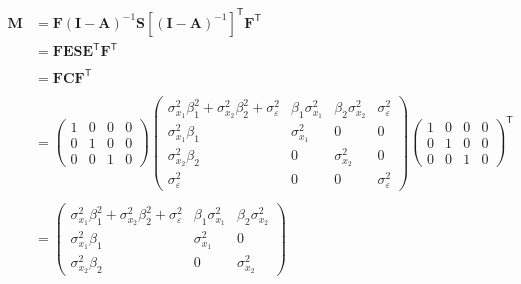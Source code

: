 \documentclass[
]{book}
\theoremstyle{definition}
\theoremstyle{definition}
\theoremstyle{definition}
\theoremstyle{remark}
\begin{document}
\begin{align*}\mathbf{M} &=\mathbf{F} \left( \mathbf{I} - \mathbf{A} \right)^{-1} \mathbf{S} \left[ \left( \mathbf{I} - \mathbf{A} \right)^{-1} \right]^{\mathsf{T}} \mathbf{F}^{\mathsf{T}}\\ &=\mathbf{F} \mathbf{E} \mathbf{S} \mathbf{E}^{\mathsf{T}} \mathbf{F}^{\mathsf{T}} \\\\ &=\mathbf{F} \mathbf{C} \mathbf{F}^{\mathsf{T}} \\\\ &=\left( \begin{array}{cccc} 1 & 0 & 0 & 0 \\ 0 & 1 & 0 & 0 \\ 0 & 0 & 1 & 0 \end{array} \right)\left( \begin{array}{cccc} \sigma  _{x _{1}} ^{2} \beta  _{1} ^{2} + \sigma  _{x _{2}} ^{2} \beta  _{2} ^{2} + \sigma  _{\varepsilon } ^{2} & \beta  _{1} \sigma  _{x _{1}} ^{2} & \beta  _{2} \sigma  _{x _{2}} ^{2} & \sigma  _{\varepsilon } ^{2} \\ \sigma  _{x _{1}} ^{2} \beta  _{1} & \sigma  _{x _{1}} ^{2} & 0 & 0 \\ \sigma  _{x _{2}} ^{2} \beta  _{2} & 0 & \sigma  _{x _{2}} ^{2} & 0 \\ \sigma  _{\varepsilon } ^{2} & 0 & 0 & \sigma  _{\varepsilon } ^{2} \end{array} \right)\left( \begin{array}{cccc} 1 & 0 & 0 & 0 \\ 0 & 1 & 0 & 0 \\ 0 & 0 & 1 & 0 \end{array} \right)^{\mathsf{T}} \\\\ &=\left( \begin{array}{ccc} \sigma  _{x _{1}} ^{2} \beta  _{1} ^{2} + \sigma  _{x _{2}} ^{2} \beta  _{2} ^{2} + \sigma  _{\varepsilon } ^{2} & \beta  _{1} \sigma  _{x _{1}} ^{2} & \beta  _{2} \sigma  _{x _{2}} ^{2} \\ \sigma  _{x _{1}} ^{2} \beta  _{1} & \sigma  _{x _{1}} ^{2} & 0 \\ \sigma  _{x _{2}} ^{2} \beta  _{2} & 0 & \sigma  _{x _{2}} ^{2} \end{array} \right)\end{align*}
\end{document}

